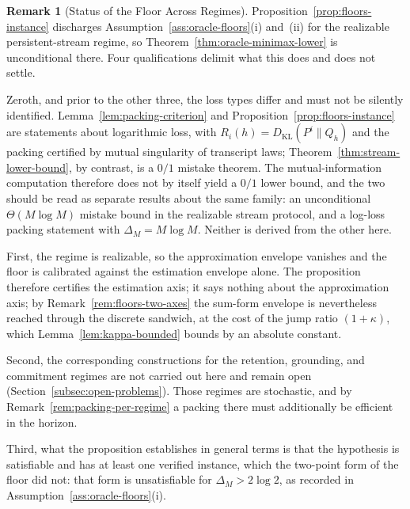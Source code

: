 \documentclass[12pt]{article}
\theoremstyle{definition}
\newtheorem{remark}[theorem]{Remark}
\newcommand{\KL}{D_{\mathrm{KL}}}
\begin{document}
\begin{remark}[Status of the Floor Across Regimes]
\label{rem:floors-status}
Proposition~\ref{prop:floors-instance} discharges
Assumption~\ref{ass:oracle-floors}(i) and~(ii) for the realizable
persistent-stream regime, so Theorem~\ref{thm:oracle-minimax-lower} is
unconditional there.  Four qualifications delimit what this does and does not
settle.

Zeroth, and prior to the other three, the loss types differ and must not be
silently identified.  Lemma~\ref{lem:packing-criterion} and
Proposition~\ref{prop:floors-instance} are statements about logarithmic loss,
with $R_i(h)=\KL(P^i\|Q_h)$ and the packing certified by mutual singularity of
transcript laws; Theorem~\ref{thm:stream-lower-bound}, by contrast, is a $0/1$
mistake theorem.  The mutual-information computation therefore does not by
itself yield a $0/1$ lower bound, and the two should be read as separate
results about the same family: an unconditional $\Theta(M\log M)$ mistake bound
in the realizable stream protocol, and a log-loss packing statement with
$\Delta_M=M\log M$.  Neither is derived from the other here.

First, the regime is realizable, so the approximation envelope vanishes and the
floor is calibrated against the estimation envelope alone.  The proposition
therefore certifies the estimation axis; it says nothing about the
approximation axis; by Remark~\ref{rem:floors-two-axes} the sum-form envelope
is nevertheless reached through the discrete sandwich, at the cost of the jump
ratio $(1+\kappa)$, which Lemma~\ref{lem:kappa-bounded} bounds by an absolute
constant.

Second, the corresponding constructions for the retention, grounding, and
commitment regimes are not carried out here and remain open
(Section~\ref{subsec:open-problems}).  Those regimes are stochastic, and by
Remark~\ref{rem:packing-per-regime} a packing there must additionally be
efficient in the horizon.

Third, what the proposition establishes in general terms is that the hypothesis
is satisfiable and has at least one verified instance, which the two-point form
of the floor did not: that form is unsatisfiable for $\Delta_M>2\log2$, as
recorded in Assumption~\ref{ass:oracle-floors}(i).
\end{remark}
\end{document}
